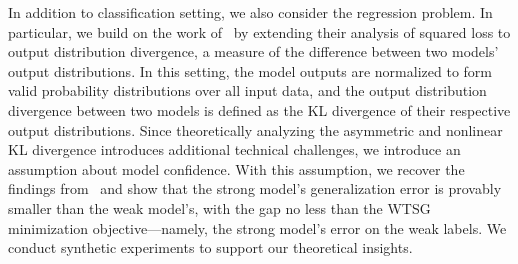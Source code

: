 In addition to classification setting, we also consider the regression problem.
In particular, we build on the work of~\citet{charikar2024quantifying} by extending their analysis of squared loss to output distribution divergence, a measure of the difference between two models' output distributions. 
In this setting, the model outputs are normalized to form valid probability distributions over all input data, and the output distribution divergence between two models is defined as the KL divergence of their respective output distributions.
Since theoretically analyzing the asymmetric and nonlinear KL divergence introduces additional technical challenges, we introduce an assumption about model confidence.
With this assumption, we recover the findings from~\citet{charikar2024quantifying} and show that the strong model's generalization error is provably smaller than the weak model's, with the gap no less than the WTSG minimization objective—namely, the strong model's error on the weak labels.
We conduct synthetic experiments to support our theoretical insights.








